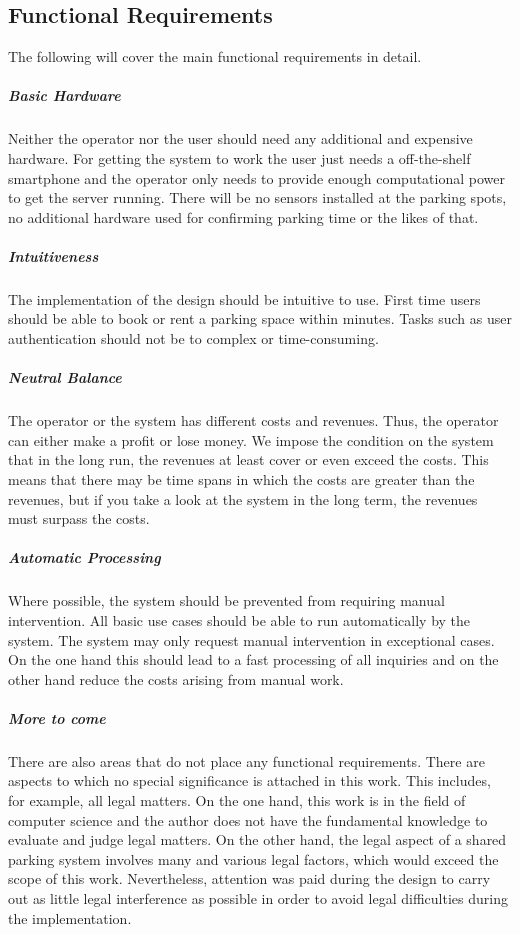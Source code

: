 \documentclass[
a4paper,     %
titlepage,   %
14pt         %
]{scrartcl}  %
\theoremstyle{mystyle}
\begin{document}
\subsection{Functional Requirements}
The following will cover the main functional requirements in detail.
\subparagraph{Basic Hardware} Neither the operator nor the user should need any additional and expensive hardware. For getting the system to work the user just needs a off-the-shelf smartphone and the operator only needs to provide enough computational power to get the server running. There will be no sensors installed at the parking spots, no additional hardware used for confirming parking time or the likes of that.
\subparagraph{Intuitiveness} The implementation of the design should be intuitive to use. First time users should be able to book or rent a parking space within minutes. Tasks such as user authentication should not be to complex or time-consuming.
\subparagraph{Neutral Balance} The operator or the system has different costs and revenues. Thus, the operator can either make a profit or lose money. We impose the condition on the system that in the long run, the revenues at least cover or even exceed the costs. This means that there may be time spans in which the costs are greater than the revenues, but if you take a look at the system in the long term, the revenues must surpass the costs.
\subparagraph{Automatic Processing} Where possible, the system should be prevented from requiring manual intervention. All basic use cases should be able to run automatically by the system. The system may only request manual intervention in exceptional cases. On the one hand this should lead to a fast processing of all inquiries and on the other hand reduce the costs arising from manual work.
\subparagraph{More to come}

There are also areas that do not place any functional requirements. There are aspects to which no special significance is attached in this work. This includes, for example, all legal matters. On the one hand, this work is in the field of computer science and the author does not have the fundamental knowledge to evaluate and judge legal matters. On the other hand, the legal aspect of a shared parking system involves many and various legal factors, which would exceed the scope of this work. Nevertheless, attention was paid during the design to carry out as little legal interference as possible in order to avoid legal difficulties during the implementation.
\end{document}
